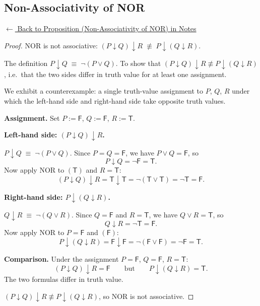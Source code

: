 
\subsection*{Non-Associativity of NOR}
\label{prf:nor-non-associativity}

\begin{remark*}[Return]
\hyperref[prop:nor-complete]{$\leftarrow$ Back to Proposition (Non-Associativity of NOR) in Notes}
\end{remark*}

\begin{proof}
\Claim NOR is not associative: $(P \downarrow Q) \downarrow R \;\not\equiv\; P \downarrow (Q \downarrow R)$.

\Given The definition $P \downarrow Q \;\equiv\; \neg(P \vee Q)$.
\Goal To show that $(P \downarrow Q) \downarrow R \not\equiv P \downarrow (Q \downarrow R)$,
i.e.\ that the two sides differ in truth value for at least one assignment.

\Strategy We exhibit a counterexample: a single truth-value assignment to $P$, $Q$, $R$
under which the left-hand side and right-hand side take opposite truth values.

\medskip
\textbf{Assignment.} Set $P := \mathsf{F}$, $Q := \mathsf{F}$, $R := \mathsf{T}$.

\medskip
\textbf{Left-hand side: $(P \downarrow Q) \downarrow R$.}

\ByDef $P \downarrow Q \;\equiv\; \neg(P \vee Q)$.
Since $P = Q = \mathsf{F}$, we have $P \vee Q = \mathsf{F}$, so
\[
    P \downarrow Q = \neg\mathsf{F} = \mathsf{T}.
\]
Now apply NOR to $(\mathsf{T})$ and $R = \mathsf{T}$:
\[
    (P \downarrow Q) \downarrow R = \mathsf{T} \downarrow \mathsf{T}
    = \neg(\mathsf{T} \vee \mathsf{T}) = \neg\mathsf{T} = \mathsf{F}.
\]

\medskip
\textbf{Right-hand side: $P \downarrow (Q \downarrow R)$.}

\ByDef $Q \downarrow R \;\equiv\; \neg(Q \vee R)$.
Since $Q = \mathsf{F}$ and $R = \mathsf{T}$, we have $Q \vee R = \mathsf{T}$, so
\[
    Q \downarrow R = \neg\mathsf{T} = \mathsf{F}.
\]
Now apply NOR to $P = \mathsf{F}$ and $(\mathsf{F})$:
\[
    P \downarrow (Q \downarrow R) = \mathsf{F} \downarrow \mathsf{F}
    = \neg(\mathsf{F} \vee \mathsf{F}) = \neg\mathsf{F} = \mathsf{T}.
\]

\medskip
\textbf{Comparison.}
Under the assignment $P = \mathsf{F}$, $Q = \mathsf{F}$, $R = \mathsf{T}$:
\[
    (P \downarrow Q) \downarrow R = \mathsf{F}
    \qquad\text{but}\qquad
    P \downarrow (Q \downarrow R) = \mathsf{T}.
\]
The two formulas differ in truth value.

\Hence $(P \downarrow Q) \downarrow R \not\equiv P \downarrow (Q \downarrow R)$,
so NOR is not associative. \AsReq
\end{proof}

